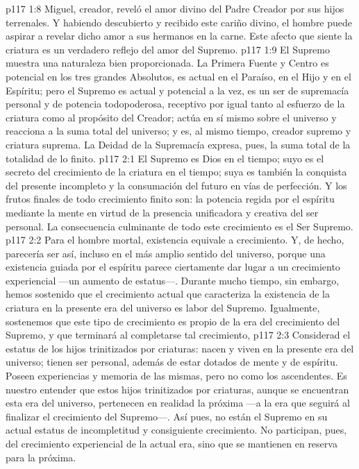 \vs p117 1:8 Miguel, creador, reveló el amor divino del Padre Creador por sus hijos terrenales. Y habiendo descubierto y recibido este cariño divino, el hombre puede aspirar a revelar dicho amor a sus hermanos en la carne. Este afecto que siente la criatura es un verdadero reflejo del amor del Supremo.
\vs p117 1:9 El Supremo muestra una naturaleza bien proporcionada. La Primera Fuente y Centro es potencial en los tres grandes Absolutos, es actual en el Paraíso, en el Hijo y en el Espíritu; pero el Supremo es actual y potencial a la vez, es un ser de supremacía personal y de potencia todopoderosa, receptivo por igual tanto al esfuerzo de la criatura como al propósito del Creador; actúa en sí mismo sobre el universo y reacciona a la suma total del universo; y es, al mismo tiempo, creador supremo y criatura suprema. La Deidad de la Supremacía expresa, pues, la suma total de la totalidad de lo finito.
\vs p117 2:1 El Supremo es Dios en el tiempo; suyo es el secreto del crecimiento de la criatura en el tiempo; suya es también la conquista del presente incompleto y la consumación del futuro en vías de perfección. Y los frutos finales de todo crecimiento finito son: la potencia regida por el espíritu mediante la mente en virtud de la presencia unificadora y creativa del ser personal. La consecuencia culminante de todo este crecimiento es el Ser Supremo.
\vs p117 2:2 Para el hombre mortal, existencia equivale a crecimiento. Y, de hecho, parecería ser así, incluso en el más amplio sentido del universo, porque una existencia guiada por el espíritu parece ciertamente dar lugar a un crecimiento experiencial ---un aumento de estatus---. Durante mucho tiempo, sin embargo, hemos sostenido que el crecimiento actual que caracteriza la existencia de la criatura en la presente era del universo es labor del Supremo. Igualmente, sostenemos que este tipo de crecimiento es propio de la era del crecimiento del Supremo, y que terminará al completarse tal crecimiento,
\vs p117 2:3 \pc Considerad el estatus de los hijos trinitizados por criaturas: nacen y viven en la presente era del universo; tienen ser personal, además de estar dotados de mente y de espíritu. Poseen experiencias y memoria de las mismas, pero no  como los ascendentes. Es nuestro entender que estos hijos trinitizados por criaturas, aunque se encuentran  esta era del universo, pertenecen en realidad  la próxima ---a la era que seguirá al finalizar el crecimiento del Supremo---. Así pues, no están  el Supremo en su actual estatus de incompletitud y consiguiente crecimiento. No participan, pues, del crecimiento experiencial de la actual era, sino que se mantienen en reserva para la próxima.
